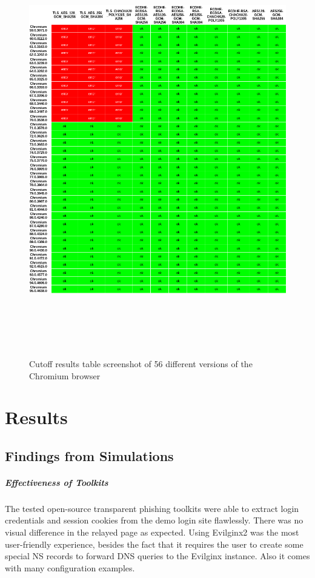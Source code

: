 \documentclass[12pt]{scrbook}
\begin{document}
\begin{figure}[!h]
	\centering
	\includegraphics[height=18cm]{./images/cipher_checker_table.png}
	\caption{Cutoff results table screenshot of 56 different versions of the
		Chromium browser}
\end{figure}

\newpage

\chapter{Results}
\section{Findings from Simulations}

\paragraph{Effectiveness of Toolkits}
The tested open-source transparent phishing toolkits were able to extract login credentials
and session cookies from the demo login site flawlessly. There was no visual difference in the relayed page
as expected. Using Evilginx2 was the most user-friendly experience, besides the fact that it requires the user
to create some special NS records to forward DNS queries to the Evilginx instance. Also it comes with many
configuration examples.
\end{document}
